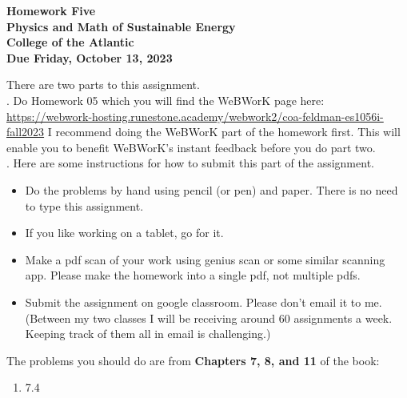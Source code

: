 \documentclass[12pt]{article}
\begin{document}
\pagestyle{empty}
 
\begin{center}
{\LARGE {\bf Homework Five}}\\
\bigskip
{\Large {\bf Physics and Math of Sustainable Energy}}\\
\bigskip
{\Large {\bf College of the Atlantic}}\\
\bigskip
{ {\bf Due Friday, October 13, 2023}}\\ 
\end{center}
\medskip


\noindent There are two parts to this assignment.\\

.  Do Homework 05 which you
will find the WeBWorK page here:
\url{https://webwork-hosting.runestone.academy/webwork2/coa-feldman-es1056i-fall2023}
I recommend doing the WeBWorK part of the homework first.  This will
enable you to benefit WeBWorK's instant feedback before you do part
two.\\ 


.  Here are some
instructions for how to submit this part of the assignment.
\begin{itemize}
\item Do the problems by hand using pencil (or pen) and paper.
  There is no need to type this assignment.
\item If you like working on a tablet, go for it. 
\item Make a pdf scan of your work using genius scan or some
  similar scanning app.  Please make the homework into a single
  pdf, not multiple pdfs.
\item Submit the assignment on google classroom.  Please don't
  email it to me.  (Between my two classes I will be receiving
  around 60 assignments a week.  Keeping track of them all in email 
  is challenging.)\\
\end{itemize}



\noindent The problems you should do are from {\bf Chapters 7, 8, and
  11} of the book:  \\ 

\begin{enumerate}
\setlength{\itemsep}{-1mm}
  \item 7.4\\ 
\end{enumerate}
\end{document}
